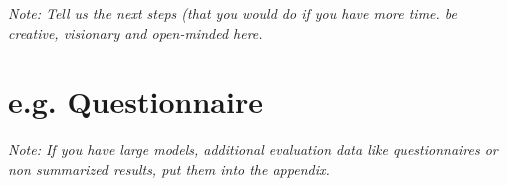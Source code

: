 \documentclass[a4paper,12pt,twoside]{report}
\begin{document}
\textit{Note: Tell us the next steps  (that you would do if you have more time. be creative, visionary and open-minded here.}



\appendix

\chapter{e.g. Questionnaire}

\textit{Note: If you have large models, additional evaluation data like questionnaires or non summarized results, put them into the appendix.}


\clearpage

\listoffigures
\clearpage

\listoftables
\clearpage



\end{document}
